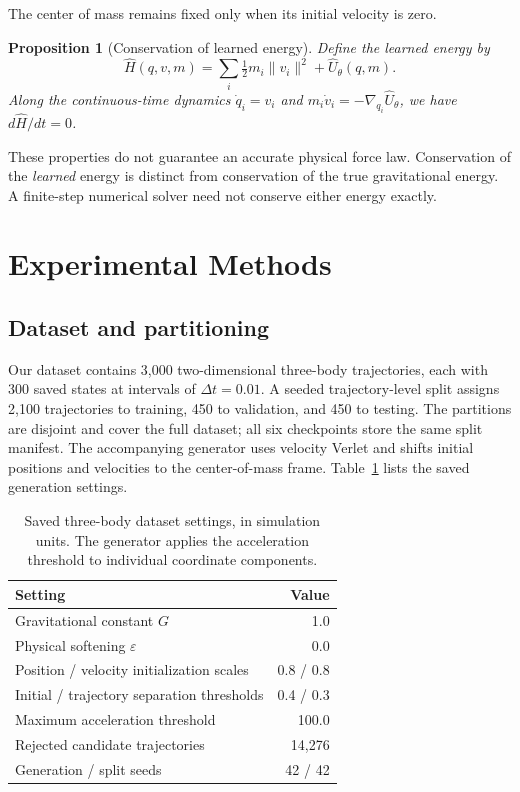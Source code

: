 \documentclass[10pt,letterpaper,twocolumn]{article}
\newtheorem{proposition}{Proposition}[section]
\newcommand{\Uhat}{\widehat U}
\newcommand{\norm}[1]{\lVert #1\rVert}
\numberwithin{equation}{section}
\begin{document}
The center of mass remains fixed only when its initial velocity is zero.

\begin{samepage}
\begin{proposition}[Conservation of learned energy]
\label{prop:energy}
Define the learned energy by
\begin{equation}
\widehat H(q,v,m)=\sum_i\tfrac12m_i\norm{v_i}^2+\Uhat_\theta(q,m).
\label{eq:learnedenergy}
\end{equation}
Along the continuous-time dynamics $\dot q_i=v_i$ and
$m_i\dot v_i=-\nabla_{q_i}\Uhat_\theta$, we have $d\widehat H/dt=0$.
\end{proposition}
\end{samepage}

These properties do not guarantee an accurate physical force law. Conservation of the
\emph{learned} energy is distinct from conservation of the true gravitational energy. A finite-step
numerical solver need not conserve either energy exactly.

\section{Experimental Methods}
\label{sec:experiments}

\subsection{Dataset and partitioning}

Our dataset contains 3,000 two-dimensional three-body trajectories, each with 300 saved states at
intervals of $\Delta t=0.01$. A seeded trajectory-level split assigns 2,100 trajectories to training,
450 to validation, and 450 to testing. The partitions are disjoint and cover the full dataset; all
six checkpoints store the same split manifest. The accompanying generator uses velocity Verlet
and shifts initial positions and velocities to the center-of-mass frame. Table~\ref{tab:data}
lists the saved generation settings.

\begin{table}[htbp]
\centering\small
\caption{Saved three-body dataset settings, in simulation units. The generator applies the
acceleration threshold to individual coordinate components.}
\label{tab:data}
\setlength{\tabcolsep}{4pt}
\begin{tabular}{lr}
\toprule
Setting & Value\\
\midrule
Gravitational constant $G$ & 1.0\\
Physical softening $\varepsilon$ & 0.0\\
Position / velocity initialization scales & 0.8 / 0.8\\
Initial / trajectory separation thresholds & 0.4 / 0.3\\
Maximum acceleration threshold & 100.0\\
Rejected candidate trajectories & 14,276\\
Generation / split seeds & 42 / 42\\
\bottomrule
\end{tabular}
\end{table}
\end{document}
